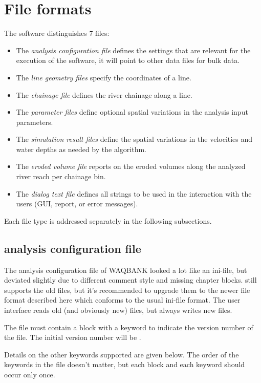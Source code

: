 \chapter{File formats} \label{Chp:FileFormats}

The software distinguishes 7 files:

\begin{itemize}
\item The \emph{analysis configuration file} defines the settings that are relevant for the execution of the software, it will point to other data files for bulk data.
\item The \emph{line geometry files} specify the coordinates of a line.
\item The \emph{chainage file} defines the river chainage along a line.
\item The \emph{parameter files} define optional spatial variations in the analysis input parameters.
\item The \emph{simulation result files} define the spatial variations in the velocities and water depths as needed by the algorithm.
\item The \emph{eroded volume file} reports on the eroded volumes along the analyzed river reach per chainage bin.
\item The \emph{dialog text file} defines all strings to be used in the interaction with the users (GUI, report, or error messages).
\end{itemize}

Each file type is addressed separately in the following subsections.

\section{analysis configuration file} \label{Sec:cfg}

The analysis configuration file of WAQBANK looked a lot like an ini-file, but deviated slightly due to different comment style and missing chapter blocks.
\dfastbe still supports the old files, but it's recommended to upgrade them to the newer file format described here which conforms to the usual ini-file format.
The user interface reads old (and obviously new) files, but always writes new files.

The file must contain a \keyw{[General]} block with a keyword  to indicate the version number of the file.
The initial version number will be .

Details on the other keywords supported are given below.
The order of the keywords in the file doesn't matter, but each block and each keyword should occur only once.

